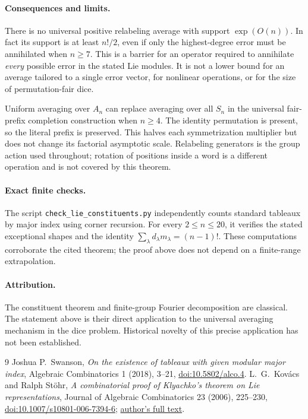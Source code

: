 \documentclass[11pt]{article}
\begin{document}
\paragraph{Consequences and limits.}
There is no universal positive relabeling average with support
$\exp(O(n))$. In fact its support is at least $n!/2$, even if only the
highest-degree error must be annihilated when $n\ge7$.
This is a barrier for an operator required to annihilate \emph{every}
possible error in the stated Lie modules. It is not a lower bound for
an average tailored to a single error vector, for nonlinear operations,
or for the size of permutation-fair dice.

Uniform averaging over $A_n$ can replace averaging over all $S_n$ in
the universal fair-prefix completion construction when $n\ge4$.
The identity permutation is present, so the literal prefix is preserved.
This halves each symmetrization multiplier but does not change its
factorial asymptotic scale. Relabeling generators is the group action
used throughout; rotation of positions inside a word is a different
operation and is not covered by this theorem.

\paragraph{Exact finite checks.}
The script \texttt{check\_lie\_constituents.py} independently counts
standard tableaux by major index using corner recursion. For every
$2\le n\le20$, it verifies the stated exceptional shapes and the
identity $\sum_\lambda d_\lambda m_\lambda=(n-1)!$.
These computations corroborate the cited theorem; the proof above
does not depend on a finite-range extrapolation.

\paragraph{Attribution.}
The constituent theorem and finite-group Fourier decomposition are
classical. The statement above is their direct application to the
universal averaging mechanism in the dice problem. Historical novelty
of this precise application has not been established.

\begin{thebibliography}{9}
 Joshua P.~Swanson, \emph{On the existence of tableaux
with given modular major index}, Algebraic Combinatorics 1 (2018), 3--21,
\href{https://doi.org/10.5802/alco.4}{doi:10.5802/alco.4}.
 L.~G.~Kov\'acs and Ralph St\"ohr,
\emph{A combinatorial proof of Klyachko's theorem on Lie representations},
Journal of Algebraic Combinatorics 23 (2006), 225--230,
\href{https://doi.org/10.1007/s10801-006-7394-6}{doi:10.1007/s10801-006-7394-6};
\href{https://archives.maths.anu.edu.au/people/Kovacs/K111.pdf}{author's full text}.
\end{thebibliography}
\end{document}
